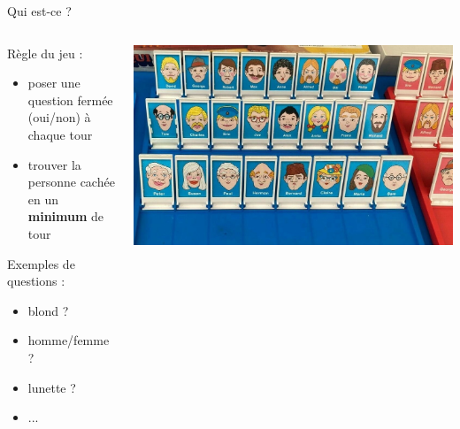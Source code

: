 \documentclass[9pt, aspectratio=169]{beamer}
\begin{document}
\begin{frame}{Qui est-ce ?} %
\begin{columns}
   \begin{column}{0.55\textwidth}
    Règle du jeu :
    \begin{itemize}
        \item poser une question fermée (oui/non) à chaque tour
        \item trouver la personne cachée en un \textbf{minimum} de tour
    \end{itemize}
    
    Exemples de questions :
    \begin{itemize}
        \item blond ?
        \item homme/femme ?
        \item lunette ?
        \item ...
    \end{itemize}
        
   \end{column}
   \begin{column}{0.45\textwidth}
		\includegraphics[width=\textwidth]{fig/jeuquiestce.jpg}
   \end{column}
\end{columns}
\end{frame}
\end{document}
